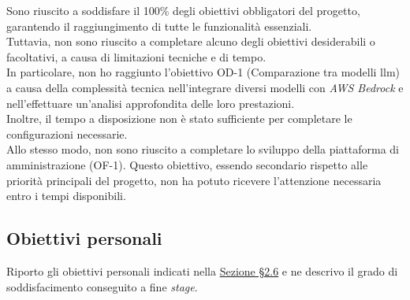 \noindent Sono riuscito a soddisfare il 100\% degli obiettivi obbligatori del progetto, garantendo il raggiungimento di tutte le funzionalità essenziali. \\
Tuttavia, non sono riuscito a completare alcuno degli obiettivi desiderabili o facoltativi, a causa di limitazioni tecniche e di tempo.\\

\noindent In particolare, non ho raggiunto l'obiettivo OD-1 (Comparazione tra modelli \gls{llm}) a causa della complessità tecnica nell'integrare diversi modelli con \textit{AWS Bedrock} e nell'effettuare un'analisi approfondita delle loro prestazioni.\\
Inoltre, il tempo a disposizione non è stato sufficiente per completare le configurazioni necessarie.\\

\noindent Allo stesso modo, non sono riuscito a completare lo sviluppo della piattaforma di amministrazione (OF-1).
Questo obiettivo, essendo secondario rispetto alle priorità principali del progetto, non ha potuto ricevere l’attenzione necessaria entro i tempi disponibili.
\pagebreak
\subsection{Obiettivi personali}
\label{subsec:raggiungimento-obiettivi-personali}

Riporto gli obiettivi personali indicati nella \hyperref[sez:obiettivi-personali]{Sezione §2.6} e ne descrivo il grado di soddisfacimento conseguito a fine \textit{stage}.\\

\renewcommand{\arraystretch}{1.5} %

